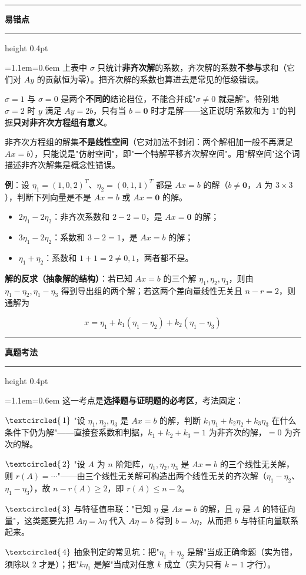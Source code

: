 \documentclass[11pt,openany,UTF8]{ctexbook}
\newcommand{\circled}[1]{\textcircled{\scriptsize\,#1}}
\newcommand{\callouthead}[2]{%
  \par\addvspace{7pt}\noindent
  {\color{#1}\rule[-0.15em]{3pt}{1.05em}}\hspace{0.5em}%
  {\bfseries\color{#1}#2}\par\nobreak\vspace{-0.35em}%
  {\color{rulesep}\hrule height 0.4pt}\nobreak\vspace{0.45em}%
  \begingroup\small\setlength{\parindent}{0pt}%
  \leftskip=1.1em\rightskip=0.6em\noindent\ignorespaces}
\newcommand{\calloutend}{\par\endgroup\addvspace{7pt}}
\newenvironment{callwarn}[1]{\callouthead{warnbar}{#1}}{\calloutend}
\newenvironment{callexam}[1]{\callouthead{exambar}{#1}}{\calloutend}
\begin{document}
\begin{callwarn}{易错点}
上表中 $\sigma$ 只统计\textbf{非齐次解}的系数，齐次解的系数\textbf{不参与}求和（它们对 $Ay$ 的贡献恒为零）。把齐次解的系数也算进去是常见的低级错误。

$\sigma=1$ 与 $\sigma=0$ 是两个\textbf{不同的}结论档位，不能合并成"$\sigma\ne0$ 就是解"。特别地 $\sigma=2$ 时 $y$ 满足 $Ay=2b$，只有当 $b=\mathbf{0}$ 时才是解——这正说明"系数和为 $1$"的判据\textbf{只对非齐次方程组有意义}。

非齐次方程组的解集\textbf{不是线性空间}（它对加法不封闭：两个解相加一般不再满足 $Ax=b$），只能说是"仿射空间"，即"一个特解平移齐次解空间"。用"解空间"这个词描述非齐次解集是概念性错误。

\end{callwarn}

\textbf{例}：设 $\eta_1=(1,0,2)^T$、$\eta_2=(0,1,1)^T$ 都是 $Ax=b$ 的解（$b\ne\mathbf{0}$，$A$ 为 $3\times3$），判断下列向量是不是 $Ax=b$ 或 $Ax=\mathbf{0}$ 的解。

\begin{itemize}
\item $2\eta_1-2\eta_2$：非齐次系数和 $2-2=0$，是 $Ax=\mathbf{0}$ 的解；
\item $3\eta_1-2\eta_2$：系数和 $3-2=1$，是 $Ax=b$ 的解；
\item $\eta_1+\eta_2$：系数和 $1+1=2\ne0,1$，两者都不是。
\end{itemize}
\textbf{解的反求（抽象解的结构）}：若已知 $Ax=b$ 的三个解 $\eta_1,\eta_2,\eta_3$，则由 $\eta_1-\eta_2,\eta_1-\eta_3$ 得到导出组的两个解；若这两个差向量线性无关且 $n-r=2$，则通解为

\[x=\eta_1+k_1(\eta_1-\eta_2)+k_2(\eta_1-\eta_3)\]

\begin{callexam}{真题考法}
这一考点是\textbf{选择题与证明题的必考区}，考法固定：

$\circled{1}$ "设 $\eta_1,\eta_2,\eta_3$ 是 $Ax=b$ 的解，判断 $k_1\eta_1+k_2\eta_2+k_3\eta_3$ 在什么条件下仍为解"——直接套系数和判据，$k_1+k_2+k_3=1$ 为非齐次的解，$=0$ 为齐次的解。

$\circled{2}$ "设 $A$ 为 $n$ 阶矩阵，$\eta_1,\eta_2,\eta_3$ 是 $Ax=b$ 的三个线性无关解，则 $r(A)=\cdots$"——由三个线性无关解可构造出两个线性无关的齐次解（$\eta_1-\eta_2$、$\eta_1-\eta_3$），故 $n-r(A)\ge2$，即 $r(A)\le n-2$。

$\circled{3}$ 与特征值串联："已知 $\eta$ 是 $Ax=b$ 的解，且 $\eta$ 是 $A$ 的特征向量"，这类题要先把 $A\eta=\lambda\eta$ 代入 $A\eta=b$ 得到 $b=\lambda\eta$，从而把 $b$ 与特征向量联系起来。

$\circled{4}$ 抽象判定的常见坑：把"$\eta_1+\eta_2$ 是解"当成正确命题（实为错，须除以 $2$ 才是）；把"$k\eta_1$ 是解"当成对任意 $k$ 成立（实为只有 $k=1$ 才行）。

\end{callexam}
\end{document}

